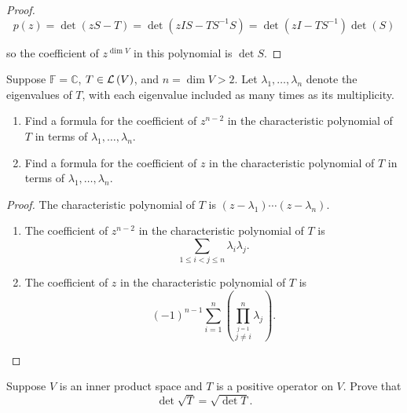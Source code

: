 \begin{proof}
    \[
        p(z) = \det(zS - T) = \det(zIS - TS^{-1}S) = \det(zI - TS^{-1})\det(S)
    \]

    so the coefficient of $z^{\dim V}$ in this polynomial is $\det S$.
\end{proof}
\newpage

\begin{exercise}\label{chapter9:sectionC:exercise13}
    Suppose $\mathbb{F} = \mathbb{C}$, $T\in\mathcal{L}\left({V}\right)$, and $n = \dim V > 2$. Let $\lambda_{1}, \ldots, \lambda_{n}$ denote the eigenvalues of $T$, with each eigenvalue included as many times as its multiplicity.
    \begin{enumerate}[label={(\alph*)}]
        \item Find a formula for the coefficient of $z^{n-2}$ in the characteristic polynomial of $T$ in terms of $\lambda_{1}, \ldots, \lambda_{n}$.
        \item Find a formula for the coefficient of $z$ in the characteristic polynomial of $T$ in terms of $\lambda_{1}, \ldots, \lambda_{n}$.
    \end{enumerate}
\end{exercise}

\begin{proof}
    The characteristic polynomial of $T$ is $(z - \lambda_{1})\cdots (z - \lambda_{n})$.

    \begin{enumerate}[label={(\alph*)}]
        \item The coefficient of $z^{n-2}$ in the characteristic polynomial of $T$ is
              \[
                  \sum_{1\leq i < j\leq n}\lambda_{i}\lambda_{j}.
              \]
        \item The coefficient of $z$ in the characteristic polynomial of $T$ is
              \[
                  {(-1)}^{n-1}\sum^{n}_{i=1}\left(\prod^{n}_{\stackrel{j=1}{j\ne i}}\lambda_{j}\right).
              \]
    \end{enumerate}
\end{proof}
\newpage

\begin{exercise}\label{chapter9:sectionC:exercise14}
    Suppose $V$ is an inner product space and $T$ is a positive operator on $V$. Prove that
    \[
        \det\sqrt{T} = \sqrt{\det T}.
    \]
\end{exercise}


